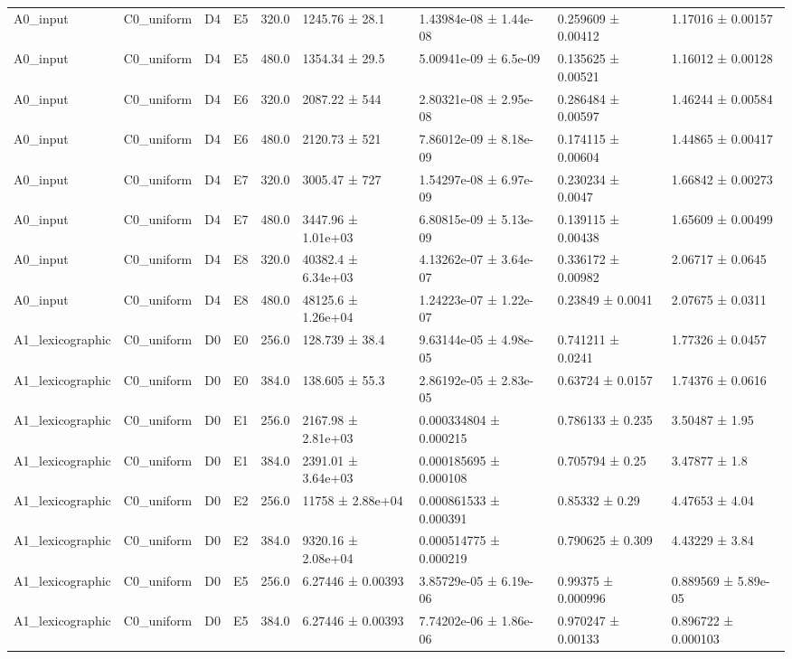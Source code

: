 \begin{table}
\begin{tabular}{lllllllll}
A0\_input & C0\_uniform & D4 & E5 & 320.0 & 1245.76 ± 28.1 & 1.43984e-08 ± 1.44e-08 & 0.259609 ± 0.00412 & 1.17016 ± 0.00157 \\
A0\_input & C0\_uniform & D4 & E5 & 480.0 & 1354.34 ± 29.5 & 5.00941e-09 ± 6.5e-09 & 0.135625 ± 0.00521 & 1.16012 ± 0.00128 \\
A0\_input & C0\_uniform & D4 & E6 & 320.0 & 2087.22 ± 544 & 2.80321e-08 ± 2.95e-08 & 0.286484 ± 0.00597 & 1.46244 ± 0.00584 \\
A0\_input & C0\_uniform & D4 & E6 & 480.0 & 2120.73 ± 521 & 7.86012e-09 ± 8.18e-09 & 0.174115 ± 0.00604 & 1.44865 ± 0.00417 \\
A0\_input & C0\_uniform & D4 & E7 & 320.0 & 3005.47 ± 727 & 1.54297e-08 ± 6.97e-09 & 0.230234 ± 0.0047 & 1.66842 ± 0.00273 \\
A0\_input & C0\_uniform & D4 & E7 & 480.0 & 3447.96 ± 1.01e+03 & 6.80815e-09 ± 5.13e-09 & 0.139115 ± 0.00438 & 1.65609 ± 0.00499 \\
A0\_input & C0\_uniform & D4 & E8 & 320.0 & 40382.4 ± 6.34e+03 & 4.13262e-07 ± 3.64e-07 & 0.336172 ± 0.00982 & 2.06717 ± 0.0645 \\
A0\_input & C0\_uniform & D4 & E8 & 480.0 & 48125.6 ± 1.26e+04 & 1.24223e-07 ± 1.22e-07 & 0.23849 ± 0.0041 & 2.07675 ± 0.0311 \\
A1\_lexicographic & C0\_uniform & D0 & E0 & 256.0 & 128.739 ± 38.4 & 9.63144e-05 ± 4.98e-05 & 0.741211 ± 0.0241 & 1.77326 ± 0.0457 \\
A1\_lexicographic & C0\_uniform & D0 & E0 & 384.0 & 138.605 ± 55.3 & 2.86192e-05 ± 2.83e-05 & 0.63724 ± 0.0157 & 1.74376 ± 0.0616 \\
A1\_lexicographic & C0\_uniform & D0 & E1 & 256.0 & 2167.98 ± 2.81e+03 & 0.000334804 ± 0.000215 & 0.786133 ± 0.235 & 3.50487 ± 1.95 \\
A1\_lexicographic & C0\_uniform & D0 & E1 & 384.0 & 2391.01 ± 3.64e+03 & 0.000185695 ± 0.000108 & 0.705794 ± 0.25 & 3.47877 ± 1.8 \\
A1\_lexicographic & C0\_uniform & D0 & E2 & 256.0 & 11758 ± 2.88e+04 & 0.000861533 ± 0.000391 & 0.85332 ± 0.29 & 4.47653 ± 4.04 \\
A1\_lexicographic & C0\_uniform & D0 & E2 & 384.0 & 9320.16 ± 2.08e+04 & 0.000514775 ± 0.000219 & 0.790625 ± 0.309 & 4.43229 ± 3.84 \\
A1\_lexicographic & C0\_uniform & D0 & E5 & 256.0 & 6.27446 ± 0.00393 & 3.85729e-05 ± 6.19e-06 & 0.99375 ± 0.000996 & 0.889569 ± 5.89e-05 \\
A1\_lexicographic & C0\_uniform & D0 & E5 & 384.0 & 6.27446 ± 0.00393 & 7.74202e-06 ± 1.86e-06 & 0.970247 ± 0.00133 & 0.896722 ± 0.000103 \\

\end{tabular}
\end{table}
